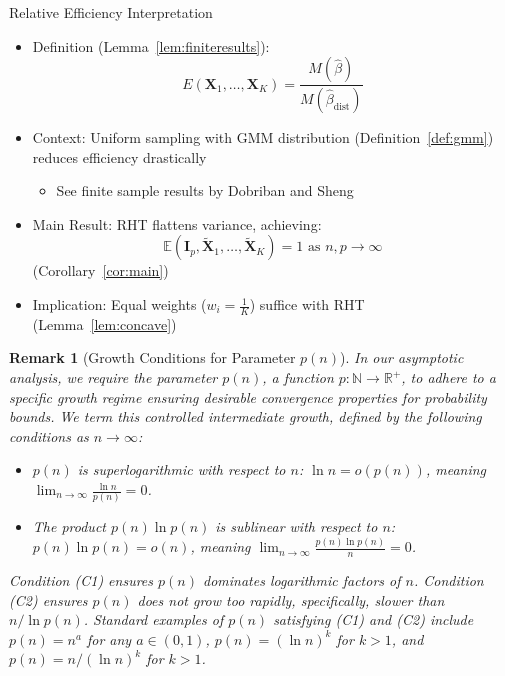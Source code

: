 \documentclass{beamer}
\newtheorem{remark}{Remark}
\theoremstyle{remark}
\begin{document}
\begin{frame}{Relative Efficiency Interpretation}
  \begin{itemize}
    \item Definition (Lemma~\ref{lem:finiteresults}):
      \[
      E(\mathbf{X}_1, \dots, \mathbf{X}_K) = \frac{M(\hat{\beta})}{M(\hat{\beta}_{\text{dist}})}
      \]
    \item Context: Uniform sampling with GMM distribution (Definition~\ref{def:gmm}) reduces efficiency drastically
      \begin{itemize}
        \item See finite sample results by Dobriban and Sheng \cite{dobriban2022distributedlinearregressionaveraging}
      \end{itemize}
    \item Main Result: RHT flattens variance, achieving:
      \[
      \mathbb{E}(\mathbf{I}_p, \tilde{\mathbf{X}}_1, \dots, \tilde{\mathbf{X}}_K) = 1 \text{ as } n,p \to \infty
      \]
      (Corollary~\ref{cor:main})
    \item Implication: Equal weights (\( w_i = \frac{1}{K} \)) suffice with RHT (Lemma~\ref{lem:concave})
  \end{itemize}
\end{frame}

\begin{frame}
\begin{remark}[Growth Conditions for Parameter $p(n)$]
\label{remark:sublinear}
In our asymptotic analysis, we require the parameter $p(n)$, a function $p: \mathbb{N} \to \mathbb{R}^+$, to adhere to a specific growth regime ensuring desirable convergence properties for probability bounds. We term this \emph{controlled intermediate growth}, defined by the following conditions as $n \to \infty$:
\begin{itemize}
    \item[(C1)] $p(n)$ is superlogarithmic with respect to $n$: $\ln n = o(p(n))$, meaning $\lim_{n \to \infty} \frac{\ln n}{p(n)} = 0$.
    \item[(C2)] The product $p(n)\ln p(n)$ is sublinear with respect to $n$: $p(n)\ln p(n) = o(n)$, meaning $\lim_{n \to \infty} \frac{p(n)\ln p(n)}{n} = 0$.
\end{itemize}
Condition (C1) ensures $p(n)$ dominates logarithmic factors of $n$. Condition (C2) ensures $p(n)$ does not grow too rapidly, specifically, slower than $n/\ln p(n)$. Standard examples of $p(n)$ satisfying (C1) and (C2) include $p(n) = n^a$ for any $a \in (0,1)$, $p(n) = (\ln n)^k$ for $k > 1$, and $p(n) = n/(\ln n)^k$ for $k > 1$.
\end{remark}
\end{frame}
\end{document}
